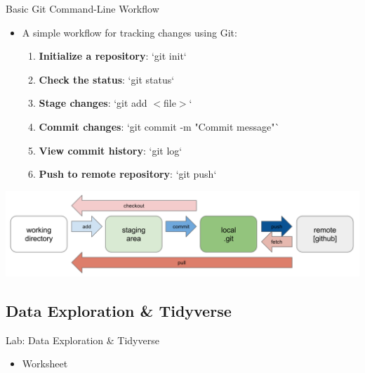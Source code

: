 \documentclass[aspectratio=169,xcolor=dvipsnames]{beamer}
\begin{document}
\begin{frame}{Basic Git Command-Line Workflow}
\begin{itemize}
    \setlength\itemsep{0.25cm}
    \item A simple workflow for tracking changes using Git:
    \begin{enumerate}
        \item \textbf{Initialize a repository}: `git init`
        \item \textbf{Check the status}: `git status`
        \item \textbf{Stage changes}: `git add $<$file$>$`
        \item \textbf{Commit changes}: `git commit -m "Commit message"`
        \item \textbf{View commit history}: `git log`
        \item \textbf{Push to remote repository}: `git push`
    \end{enumerate}
\end{itemize}
\vspace{0.25cm}
\centering
\includegraphics[scale=0.33]{images/git_workflow.png}
\end{frame}


\subsection{Data Exploration \& Tidyverse}

\begin{frame}{Lab: Data Exploration \& Tidyverse}
\begin{itemize}
	\setlength\itemsep{0.5cm}
	\item Worksheet

\end{itemize}
\end{frame}
\end{document}
